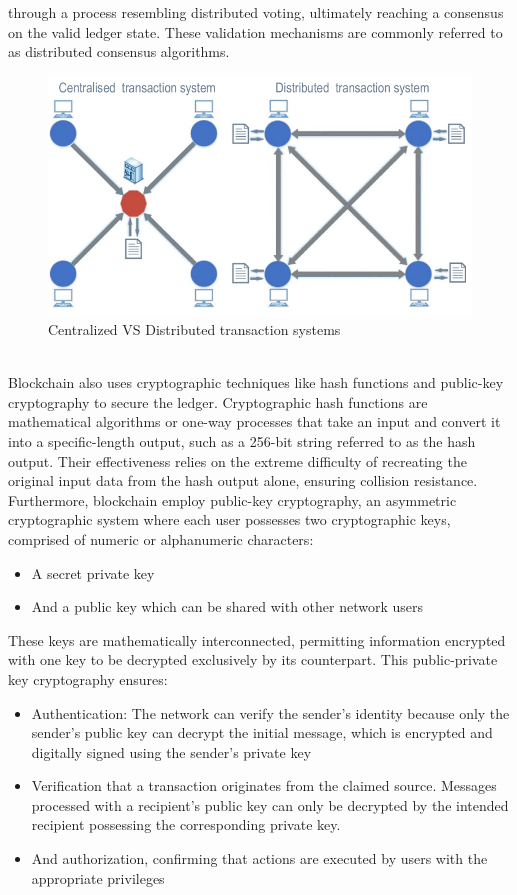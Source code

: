 through a process resembling distributed voting, ultimately reaching a consensus on the valid ledger state. These validation mechanisms are commonly referred to as distributed
consensus algorithms.\\
\begin{figure}[h!]
    \centering
    \includegraphics[scale=0.4]{Figures/centralised_vs_distributed.png}
    \caption{Centralized VS Distributed transaction systems \cite{andoni2019blockchain}}
\end{figure}\\
Blockchain also uses cryptographic techniques like hash functions and public-key cryptography to secure the ledger. Cryptographic hash functions are mathematical algorithms
or one-way processes that take an input and convert it into a specific-length output, such as a 256-bit string referred to as the hash output. Their effectiveness relies on the
extreme difficulty of recreating the original input data from the hash output alone, ensuring collision resistance. Furthermore, blockchain employ public-key cryptography, an
asymmetric cryptographic system where each user possesses two cryptographic keys, comprised of numeric or alphanumeric characters:
\begin{itemize}
    \item A secret private key
    \item And a public key which can be shared with other network users
\end{itemize}
These keys are mathematically interconnected, permitting information encrypted with one key to be decrypted exclusively by its counterpart. This public-private key cryptography
ensures:
\begin{itemize}
    \item Authentication: The network can verify the sender's identity because only the sender's public key can decrypt the initial message, which is encrypted and digitally signed
          using the sender's private key
    \item Verification that a transaction originates from the claimed source. Messages processed with a recipient's public key can only be decrypted by the intended recipient possessing
          the corresponding private key.
    \item And authorization, confirming that actions are executed by users with the appropriate privileges
\end{itemize}
